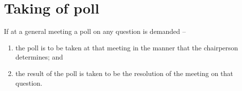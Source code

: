 \section{Taking of poll}
\label{rule:poll}

If at a general meeting a poll on any question is demanded --
\begin{enumerate}
	\item the poll is to be taken at that meeting in the manner that the chairperson determines; and
	\item the result of the poll is taken to be the resolution of the meeting on that question.
\end{enumerate}